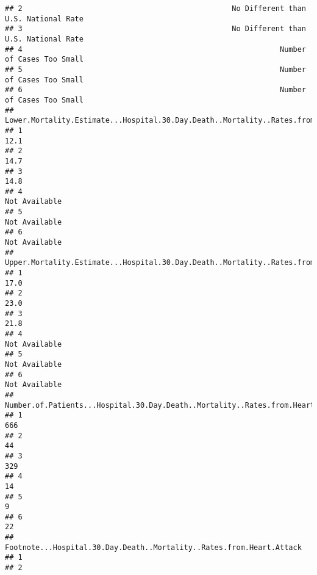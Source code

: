 \documentclass[]{article}
\begin{document}
\begin{verbatim}
## 2                                                No Different than U.S. National Rate
## 3                                                No Different than U.S. National Rate
## 4                                                           Number of Cases Too Small
## 5                                                           Number of Cases Too Small
## 6                                                           Number of Cases Too Small
##   Lower.Mortality.Estimate...Hospital.30.Day.Death..Mortality..Rates.from.Heart.Attack
## 1                                                                                 12.1
## 2                                                                                 14.7
## 3                                                                                 14.8
## 4                                                                        Not Available
## 5                                                                        Not Available
## 6                                                                        Not Available
##   Upper.Mortality.Estimate...Hospital.30.Day.Death..Mortality..Rates.from.Heart.Attack
## 1                                                                                 17.0
## 2                                                                                 23.0
## 3                                                                                 21.8
## 4                                                                        Not Available
## 5                                                                        Not Available
## 6                                                                        Not Available
##   Number.of.Patients...Hospital.30.Day.Death..Mortality..Rates.from.Heart.Attack
## 1                                                                            666
## 2                                                                             44
## 3                                                                            329
## 4                                                                             14
## 5                                                                              9
## 6                                                                             22
##                                Footnote...Hospital.30.Day.Death..Mortality..Rates.from.Heart.Attack
## 1                                                                                                  
## 2                                                                                                  

\end{verbatim}
\end{document}
